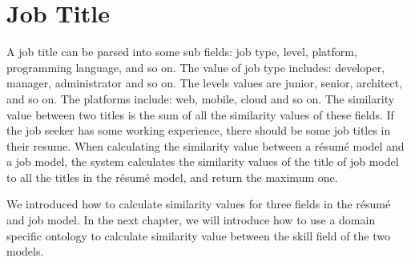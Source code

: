 \section{Job Title}

A job title can be parsed into some sub fields: job type, level, platform, programming language, and so on.  The value of job type includes: developer, manager, administrator and so on. The levels values are junior, senior, architect, and so on. The platforms include: web, mobile, cloud and so on. The similarity value between two titles is the sum of all the similarity values of these fields. If the job seeker has some working experience, there should be some job titles in their resume.  When calculating the similarity value between a r\'esum\'e model and a job model, the system calculates the similarity values of the title of job model to all the titles in the r\'esum\'e model, and return the maximum one.

We introduced how to calculate similarity values for three fields in the r\'esum\'e and job model. In the next chapter, we will introduce how to use a domain specific ontology to calculate similarity value between the skill field of the two models. 

